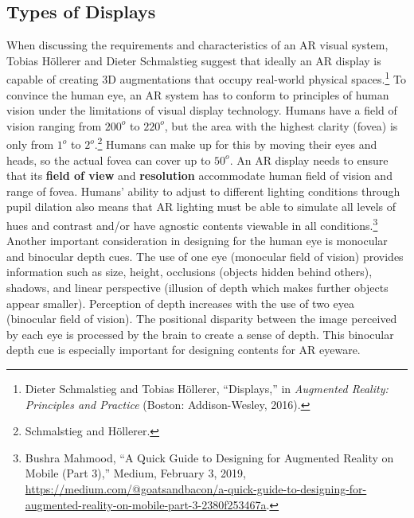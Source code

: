 \subsection{Types of Displays}
When discussing the requirements and characteristics of an AR visual system, Tobias Höllerer and Dieter Schmalstieg suggest that ideally an AR display is capable of creating 3D augmentations that occupy real-world physical spaces.\footnote{Dieter Schmalstieg and Tobias Höllerer, “Displays,” in \textit{Augmented Reality: Principles and Practice} (Boston: Addison-Wesley, 2016).} To convince the human eye, an AR system has to conform to principles of human vision under the limitations of visual display technology. Humans have a field of vision ranging from $200^o$ to $220^o$, but the area with the highest clarity (fovea) is only from $1^o$ to $2^o$.\footnote{Schmalstieg and Höllerer.} Humans can make up for this by moving their eyes and heads, so the actual fovea can cover up to $50^o$. An AR display needs to ensure that its \textbf{field of view} and \textbf{resolution} accommodate human field of vision and range of fovea. Humans' ability to adjust to different lighting conditions through pupil dilation also means that AR lighting must be able to simulate all levels of hues and contrast and/or have agnostic contents viewable in all conditions.\footnote{Bushra Mahmood, “A Quick Guide to Designing for Augmented Reality on Mobile (Part 3),” Medium, February 3, 2019, \url{https://medium.com/@goatsandbacon/a-quick-guide-to-designing-for-augmented-reality-on-mobile-part-3-2380f253467a}.} Another important consideration in designing for the human eye is monocular and binocular depth cues. The use of one eye (monocular field of vision) provides information such as size, height, occlusions (objects hidden behind others), shadows, and linear perspective (illusion of depth which makes further objects appear smaller). Perception of depth increases with the use of two eyea (binocular field of vision). The positional disparity between the image perceived by each eye is processed by the brain to create a sense of depth. This binocular depth cue is especially important for designing contents for AR eyeware.


